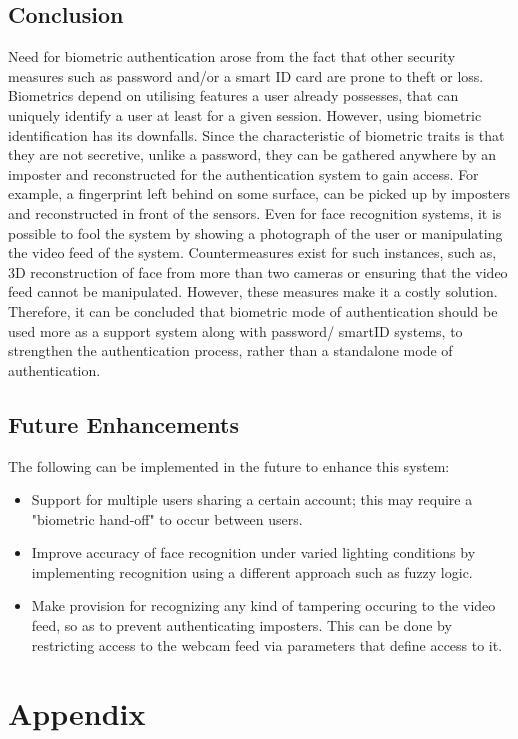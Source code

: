 \documentclass[12pt]{report}			%
\begin{document}
\section {Conclusion}
Need for biometric authentication arose from the fact that other security measures such as password and/or a smart ID card are prone to theft or loss. Biometrics depend on utilising features a user already possesses, that can uniquely identify a user at least for a given session. However, using biometric identification has its downfalls. Since the characteristic of biometric traits is that they are not secretive, unlike a password, they can be gathered anywhere by an imposter and reconstructed for the authentication system to gain access. For example, a fingerprint left behind on some surface, can be picked up by imposters and reconstructed in front of the sensors. Even for face recognition systems, it is possible to fool the system by showing a photograph of the user or manipulating the video feed of the system. Countermeasures exist for such instances, such as, 3D reconstruction of face from more than two cameras or ensuring that the video feed cannot be manipulated. However, these measures make it a costly solution. Therefore, it can be concluded that biometric mode of authentication should be used more as a support system along with password/ smartID systems, to strengthen the authentication process, rather than a standalone mode of authentication.   

\section {Future Enhancements}
The following can be implemented in the future to enhance this system:
\begin{itemize}
\item Support for multiple users sharing a certain account; this may require a "biometric hand-off" to occur between users.
\item Improve accuracy of face recognition under varied lighting conditions by implementing recognition using a different approach such as fuzzy logic.
\item Make provision for recognizing any kind of tampering occuring to the video feed, so as to prevent authenticating imposters. This can be done by restricting access to the webcam feed via parameters that define access to it.
\end{itemize}

\newpage
\chapter{ Appendix }
\end{document}
